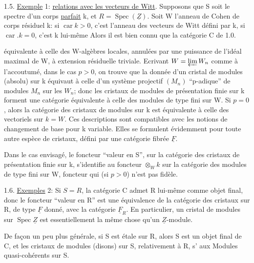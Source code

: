 1.5. \uline{Exemple} 1: \uline{relations avec les vecteurs de Witt}. Supposons que S soit le spectre d'un corps \uline{parfait}  k, et $R=\operatorname{Spec}(\underline Z)$. Soit W l'anneau de Cohen de corps résiduel k: si $\operatorname{car}k>0$, c'est l'anneau des vecteurs de Witt défini par k, si $\operatorname{car}.k=0$, c'est k lui-même Alors il est bien connu que la catégorie C de 1.0.



 équivalente à celle des W-algèbres locales, annulées par une puissance de l'idéal maximal de W, à extension résiduelle triviale. Ecrivant $W=\varprojlim W_n$ comme à l'accoutumé, dans le cas $p>0$, on trouve que la donnée d'un cristal de modules (absolu) sur k équivaut à celle d'un système projectif $(M_n)$ ``p-adique'' de modules $M_n$ sur les $W_n$; donc les cristaux de modules de présentation finie sur k forment une catégorie équivalente à celle des modules de type fini sur W. Si $p=0$, alors la catégorie des cristaux de modules sur k est équivalente à celle des  vectoriels sur $k=W$. Ces descriptions sont compatibles avec les notions de changement de base pour k variable. Elles se formulent évidemment pour toute autre espèce de cristaux, défini par une catégorie fibrée $\underline F$.

Dans le cas envisagé, le foncteur\deleted{\unsure{:}} ``valeur en S'', sur la catégorie des cristaux de présentation finie sur k, s'identifie au foncteur $\otimes_Wk$ sur la catégorie des modules de type fini sur W, foncteur qui (si $p>0$) n'est pas fidèle.

1.6. \uline{Exemples} 2:  Si $S=R$, la catégorie C admet R lui-même comme objet final, donc le foncteur ``valeur en R'' est une équivalence de la catégorie des cristaux sur R, de type $\underline F$ donné, avec la catégorie $\underline F_R$. En particulier, un cristal de modules sur $\operatorname{Spec}\underline Z$ est essentiellement la même chose qu'un $\underline Z$-module.

De façon un peu plus générale, si S est étale sur R, alors S est un objet final de C, et les cristaux de modules (disons) sur S, relativement à R, s' aux Modules quasi-cohérents sur S.

